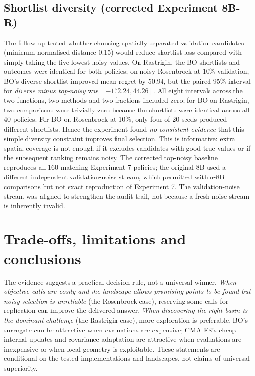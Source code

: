 \documentclass[11pt,a4paper]{article}
\begin{document}
\subsection{Shortlist diversity (corrected Experiment 8B-R)}
The follow-up tested whether choosing spatially separated validation candidates (minimum normalised distance 0.15) would reduce shortlist loss compared with simply taking the five lowest noisy values. On Rastrigin, the BO shortlists and outcomes were identical for both policies; on noisy Rosenbrock at 10\% validation, BO's diverse shortlist improved mean regret by 50.94, but the paired 95\% interval for \emph{diverse minus top-noisy} was $[-172.24,44.26]$. All eight intervals across the two functions, two methods and two fractions included zero; for BO on Rastrigin, two comparisons were trivially zero because the shortlists were identical across all 40 policies. For BO on Rosenbrock at 10\%, only four of 20 seeds produced different shortlists. Hence the experiment found \emph{no consistent evidence} that this simple diversity constraint improves final selection. This is informative: extra spatial coverage is not enough if it excludes candidates with good true values or if the subsequent ranking remains noisy. The corrected top-noisy baseline reproduces all 160 matching Experiment 7 policies; the original 8B used a different independent validation-noise stream, which permitted within-8B comparisons but not exact reproduction of Experiment 7. The validation-noise stream was aligned to strengthen the audit trail, not because a fresh noise stream is inherently invalid.

\section{Trade-offs, limitations and conclusions}
The evidence suggests a practical decision rule, not a universal winner. \emph{When objective calls are costly and the landscape allows promising points to be found but noisy selection is unreliable} (the Rosenbrock case), reserving some calls for replication can improve the delivered answer. \emph{When discovering the right basin is the dominant challenge} (the Rastrigin case), more exploration is preferable. BO's surrogate can be attractive when evaluations are expensive; CMA-ES's cheap internal updates and covariance adaptation are attractive when evaluations are inexpensive or when local geometry is exploitable. These statements are conditional on the tested implementations and landscapes, not claims of universal superiority.
\end{document}
